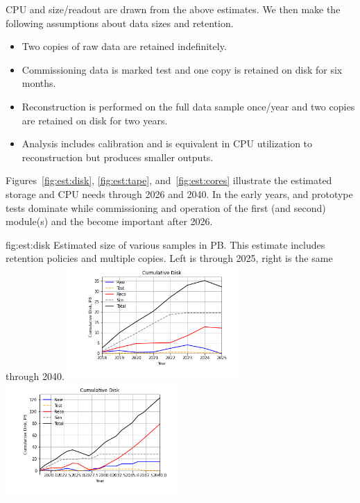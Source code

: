 \documentclass[../main-v1.tex]{subfiles}
\begin{document}
CPU and size/readout are drawn from the above estimates. We then make the following assumptions about data sizes and retention.  

\begin{itemize}
\item Two copies of raw data are retained indefinitely.
\item Commissioning data is marked test and one copy is retained on disk for six months. 
\item Reconstruction is performed on the full data sample once/year and two copies are retained on disk for two years.  
\item Analysis includes calibration and is  equivalent in CPU utilization to reconstruction but produces smaller outputs. 
\end{itemize}

Figures~\ref{fig:est:disk}, \ref{fig:est:tape}, and~\ref{fig:est:cores} illustrate the estimated storage and CPU needs through 2026 and 2040.  In the early years,  and  prototype tests dominate while commissioning and operation of the first (and second)  module(s) and the  become important after 2026. 

\begin{dunefigure}
{fig:est:disk}
{Estimated size of various samples in PB. This estimate includes retention policies and multiple copies. Left is through 2025, right is the same through 2040.}
\includegraphics[width=0.49\textwidth]{graphics/IntroFigures/soon/Cumulative-Disk.png}
\includegraphics[width=0.49\textwidth]{graphics/IntroFigures/2040/Cumulative-Disk.png}
\end{dunefigure}
\end{document}
